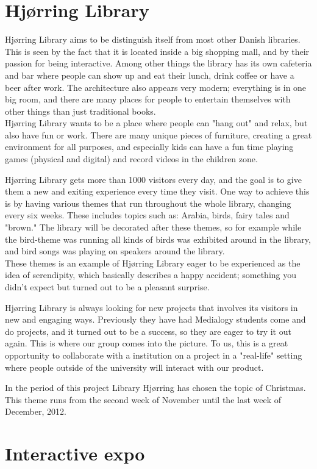 \section{Hj{\o}rring Library}
Hj{\o}rring Library aims to be distinguish itself from most other Danish libraries. This is seen by the fact that it is located inside a big shopping mall, and by their passion for being interactive. Among other things the library has its own cafeteria and bar where people can show up and eat their lunch, drink coffee or have a beer after work. The architecture also appears very modern; everything is in one big room, and there are many places for people to entertain themselves with other things than just traditional books. \\ Hj{\o}rring Library wants to be a place where people can "hang out" and relax, but also have fun or work. There are many unique pieces of furniture, creating a great environment for all purposes, and especially kids can have a fun time playing games (physical and digital) and record videos in the children zone.

Hj{\o}rring Library gets more than 1000 visitors every day, and the goal is to give them a new and exiting experience every time they visit. One way to achieve this is by having various themes that run throughout the whole library, changing every six weeks. These includes topics such as: Arabia, birds, fairy tales and "brown." The library will be decorated after these themes, so for example while the bird-theme was running all kinds of birds was exhibited around in the library, and bird songs was playing on speakers around the library.\\
These themes is an example of Hj{\o}rring Library eager to be experienced as the idea of serendipity, which basically describes a happy accident; something you didn't expect but turned out to be a pleasant surprise.

Hj{\o}rring Library is always looking for new projects that involves its visitors in new and engaging ways. Previously they have had Medialogy students come and do projects, and it turned out to be a success, so they are eager to try it out again. This is where our group comes into the picture. To us, this is a great opportunity to collaborate with a institution on a project in a "real-life" setting where people outside of the university will interact with our product.

In the period of this project Library Hj{\o}rring has chosen the topic of Christmas. This theme runs from the second week of November until the last week of December, 2012.

\section{Interactive expo}